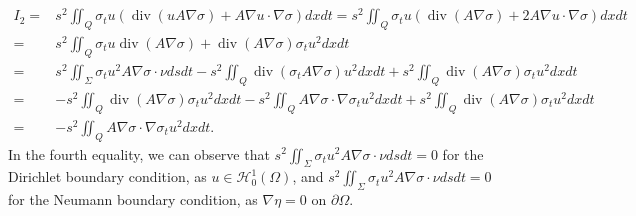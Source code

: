 \documentclass[9pt,reqno]{amsart}
\theoremstyle{plain}
\numberwithin{equation}{section}
\numberwithin{theorem}{section}
\DeclareMathOperator*{\Div}{\mathrm{div}}
\begin{document}
	\begin{equation}\label{I22}
		\begin{split}
			I_2  =& s^2  \iint_Q \sigma_t u (\Div(u A \nabla \sigma) + A\nabla u \cdot \nabla \sigma) dx  dt
			= s^2  \iint_Q \sigma_t u (\Div( A \nabla \sigma) + 2 A\nabla u \cdot \nabla \sigma) dx  dt\\
			=& s^2  \iint_Q \sigma_t u \Div( A \nabla \sigma) + \Div( A \nabla \sigma) \sigma_t u^2  dx  dt\\
			=& s^2 \iint_\Sigma \sigma_t u^2 A \nabla \sigma  \cdot \nu dsdt - s^2  \iint_Q \Div(\sigma_t A \nabla \sigma)u^2 dx dt + s^2  \iint_Q \Div( A \nabla \sigma) \sigma_t u^2 dx  dt\\
			=& - s^2  \iint_Q \Div( A \nabla \sigma) \sigma_t u^2 dx  dt -s^2\iint_Q  A \nabla \sigma \cdot\nabla \sigma_t u^2    dx  dt + s^2\iint_Q \Div( A \nabla \sigma) \sigma_t u^2 dx dt\\
			=& -s^2\iint_Q  A \nabla \sigma \cdot\nabla \sigma_t u^2    dx  dt.
		\end{split}
	\end{equation}
	In the fourth equality, we can observe that $s^2 \iint_\Sigma \sigma_t u^2 A \nabla \sigma \cdot \nu dsdt=0$ for the Dirichlet boundary condition, as $u \in \mathcal{H}_0^1(\Omega)$, and $s^2 \iint_\Sigma \sigma_t u^2 A \nabla \sigma \cdot \nu dsdt=0$ for the Neumann boundary condition, as $\nabla \eta=0$ on $\partial \Omega$.
	
\end{document}
